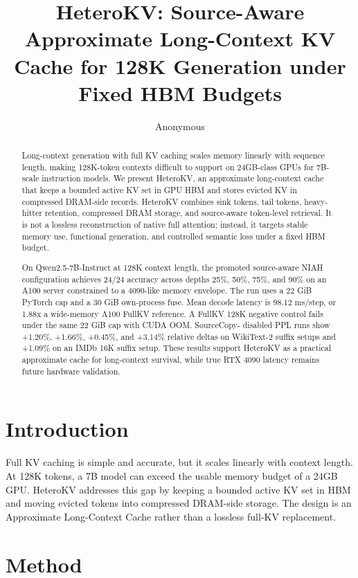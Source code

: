 \documentclass[10pt]{article}
\title{HeteroKV: Source-Aware Approximate Long-Context KV Cache for 128K Generation under Fixed HBM Budgets}
\author{Anonymous}
\date{}
\begin{document}
\maketitle

\begin{abstract}
Long-context generation with full KV caching scales memory linearly with
sequence length, making 128K-token contexts difficult to support on
24GB-class GPUs for 7B-scale instruction models. We present HeteroKV, an
approximate long-context cache that keeps a bounded active KV set in GPU HBM
and stores evicted KV in compressed DRAM-side records. HeteroKV combines sink
tokens, tail tokens, heavy-hitter retention, compressed DRAM storage, and
source-aware token-level retrieval. It is not a lossless reconstruction of
native full attention; instead, it targets stable memory use, functional
generation, and controlled semantic loss under a fixed HBM budget.

On Qwen2.5-7B-Instruct at 128K context length, the promoted source-aware NIAH
configuration achieves 24/24 accuracy across depths 25\%, 50\%, 75\%, and
90\% on an A100 server constrained to a 4090-like memory envelope. The run uses
a 22 GiB PyTorch cap and a 30 GiB own-process fuse. Mean decode latency is
98.12 ms/step, or 1.88x a wide-memory A100 FullKV reference. A FullKV 128K
negative control fails under the same 22 GiB cap with CUDA OOM. SourceCopy-
disabled PPL runs show +1.20\%, +1.66\%, +0.45\%, and +3.14\% relative deltas
on WikiText-2 suffix setups and +1.09\% on an IMDb 16K suffix setup. These
results support HeteroKV as a practical approximate cache for long-context
survival, while true RTX 4090 latency remains future hardware validation.
\end{abstract}

\section{Introduction}

Full KV caching is simple and accurate, but it scales linearly with context
length. At 128K tokens, a 7B model can exceed the usable memory budget of a
24GB GPU. HeteroKV addresses this gap by keeping a bounded active KV set in HBM
and moving evicted tokens into compressed DRAM-side storage. The design is an
Approximate Long-Context Cache rather than a lossless full-KV replacement.

\section{Method}
\end{document}
